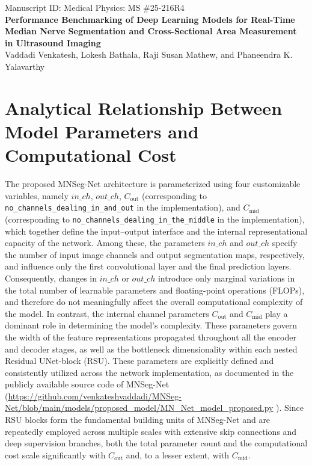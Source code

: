 \documentclass[12pt,letterpaper]{article}
\begin{document}
 
 \begin{center}

 Manuscript ID: Medical Physics: MS \#25-216R4 \\
  \vspace{3mm}
 \textbf{Performance Benchmarking of Deep Learning Models for Real-Time Median Nerve Segmentation and Cross-Sectional Area Measurement in Ultrasound Imaging}\\ 
 \vspace{3mm}
{\large{Vaddadi Venkatesh}, \large{Lokesh Bathala}, \large{Raji Susan Mathew}, and \large{Phaneendra K. Yalavarthy}}\\
 \end{center}

\section{Analytical Relationship Between Model Parameters and Computational Cost}

The proposed MNSeg-Net architecture is parameterized using four customizable variables, namely $in\_ch$, $out\_ch$, $C_{\text{out}}$  (corresponding to \texttt{no\_channels\_dealing\_in\_and\_out} in the implementation), and $C_{\text{mid}}$ (corresponding to \texttt{no\_channels\_dealing\_in\_the\_middle}  in the implementation), which together define the input--output interface and the internal representational capacity of the network. Among these, the parameters $in\_ch$ and $out\_ch$ specify the number of input image channels and output segmentation maps, respectively, and influence only the first convolutional layer and the final prediction layers. Consequently, changes in $in\_ch$ or $out\_ch$ introduce only marginal variations in the total number of learnable parameters and floating-point operations (FLOPs), and therefore do not meaningfully affect the overall computational complexity of the model. In contrast, the internal channel parameters $C_{\text{out}}$ and $C_{\text{mid}}$  play a dominant role in determining the model’s complexity. These parameters govern the width of the feature representations propagated throughout all the encoder and decoder stages, as well as the bottleneck dimensionality within each nested Residual UNet-block (RSU). These parameters are explicitly defined and consistently utilized across the network implementation, as documented in the publicly available source code of MNSeg-Net (\url{https://github.com/venkateshvaddadi/MNSeg-Net/blob/main/models/proposed_model/MN_Net_model_proposed.py}
). Since RSU blocks form the fundamental building units of MNSeg-Net and are repeatedly employed across multiple scales with extensive skip connections and deep supervision branches, both the total parameter count and the computational cost scale significantly with $C_{\text{out}}$ and, to a lesser extent, with $C_{\text{mid}}$. 
\end{document}
